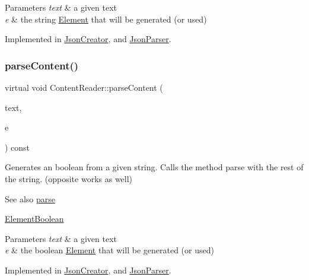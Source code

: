 \begin{DoxyParams}{Parameters}
{\em text} & a given text \\
\hline
{\em e} & the string \mbox{\hyperlink{classElement}{Element}} that will be generated (or used) \\
\hline
\end{DoxyParams}


Implemented in \mbox{\hyperlink{classJsonCreator_acf8d7cd3dcbb669fd9eb5dec95e069f3}{Json\+Creator}}, and \mbox{\hyperlink{classJsonParser_a94737a7518f05e4ed43a753f4148b354}{Json\+Parser}}.

\mbox{\label{classContentReader_a3ee0aec579c723f17742e10fe7c75e39}} 
\subsubsection{\texorpdfstring{parse\+Content()}{parseContent()}\hspace{0.1cm}{\footnotesize\ttfamily [3/6]}}
{\footnotesize\ttfamily virtual void Content\+Reader\+::parse\+Content (\begin{DoxyParamCaption}\item[{std\+::string \&}]{text,  }\item[{\mbox{\hyperlink{classElementBoolean}{Element\+Boolean}} $\ast$}]{e }\end{DoxyParamCaption}) const\hspace{0.3cm}{\ttfamily [pure virtual]}}

Generates an boolean from a given string. Calls the method parse with the rest of the string. (opposite works as well) \begin{DoxySeeAlso}{See also}
\mbox{\hyperlink{classContentReader_a7fff2e63a2e8fa216665604f69974e1d}{parse}} 

\mbox{\hyperlink{classElementBoolean}{Element\+Boolean}}
\end{DoxySeeAlso}

\begin{DoxyParams}{Parameters}
{\em text} & a given text \\
\hline
{\em e} & the boolean \mbox{\hyperlink{classElement}{Element}} that will be generated (or used) \\
\hline
\end{DoxyParams}


Implemented in \mbox{\hyperlink{classJsonCreator_a95fb65046a7467b8e48feaf92a62b40c}{Json\+Creator}}, and \mbox{\hyperlink{classJsonParser_a0857f5d286e5f0b973e2791e5e7a4e83}{Json\+Parser}}.

